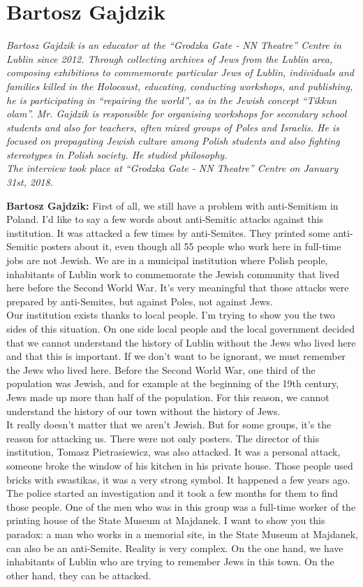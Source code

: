 \section{Bartosz Gajdzik}

\textit{Bartosz Gajdzik is an educator at the ``Grodzka Gate ‐ NN Theatre'' Centre in Lublin since 2012. Through collecting archives of Jews from the Lublin area, composing exhibitions to commemorate particular Jews of Lublin, individuals and families killed in the Holocaust, educating, conducting workshops, and publishing, he is participating in ``repairing the world'', as in the Jewish concept ``Tikkun olam''. Mr. Gajdzik is responsible for organising workshops for secondary school students and also for teachers, often mixed groups of Poles and Israelis. He is focused on propagating Jewish culture among Polish students and also fighting stereotypes in Polish society. He studied philosophy.\\
The interview took place at ``Grodzka Gate ‐ NN Theatre'' Centre on January 31st, 2018.}\par
\vspace*{2em}
\textbf{Bartosz Gajdzik:} First of all, we still have a problem with anti-Semitism in Poland. I’d like to say a few words about anti-Semitic attacks against this institution. It was attacked a few times by anti-Semites. They printed some anti-Semitic posters about it, even though all 55 people who work here in full-time jobs are not Jewish. We are in a municipal institution where Polish people, inhabitants of Lublin work to commemorate the Jewish community that lived here before the Second World War. It’s very meaningful that those attacks were prepared by anti-Semites, but against Poles, not against Jews.\\ 
Our institution exists thanks to local people. I’m trying to show you the two sides of this situation. On one side local people and the local government decided that we cannot understand the history of Lublin without the Jews who lived here and that this is important. If we don’t want to be ignorant, we must remember the Jews who lived here. Before the Second World War, one third of the population was Jewish, and for example at the beginning of the 19th century, Jews made up more than half of the population. For this reason, we cannot understand the history of our town without the history of Jews.\\ 
It really doesn’t matter that we aren’t Jewish. But for some groups, it’s the reason for attacking us. There were not only posters. The director of this institution, Tomasz Pietrasiewicz, was also attacked. It was a personal attack, someone broke the window of his kitchen in his private house. Those people used bricks with swastikas, it was a very strong symbol. It happened a few years ago. The police started an investigation and it took a few months for them to find those people. One of the men who was in this group was a full-time worker of the printing house of the State Museum at Majdanek. I want to show you this paradox: a man who works in a memorial site, in the State Museum at Majdanek, can also be an anti-Semite. Reality is very complex. On the one hand, we have inhabitants of Lublin who are trying to remember Jews in this town. On the other hand, they can be attacked.\\  

